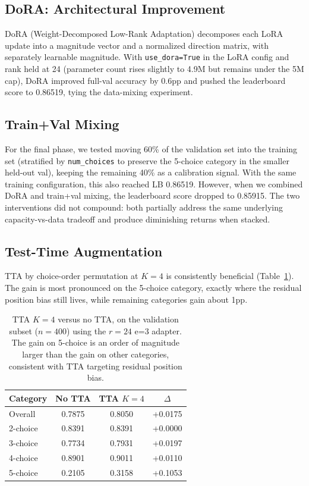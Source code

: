 \documentclass[11pt]{article}
\begin{document}
\subsection{DoRA: Architectural Improvement}

DoRA (Weight-Decomposed Low-Rank Adaptation) decomposes each LoRA update into a magnitude vector and a normalized direction matrix, with separately learnable magnitude. With \texttt{use\_dora=True} in the LoRA config and rank held at 24 (parameter count rises slightly to 4.9M but remains under the 5M cap), DoRA improved full-val accuracy by 0.6pp and pushed the leaderboard score to 0.86519, tying the data-mixing experiment.

\subsection{Train+Val Mixing}

For the final phase, we tested moving 60\% of the validation set into the training set (stratified by \texttt{num\_choices} to preserve the 5-choice category in the smaller held-out val), keeping the remaining 40\% as a calibration signal. With the same training configuration, this also reached LB 0.86519. However, when we combined DoRA and train+val mixing, the leaderboard score dropped to 0.85915. The two interventions did not compound: both partially address the same underlying capacity-vs-data tradeoff and produce diminishing returns when stacked.

\subsection{Test-Time Augmentation}

TTA by choice-order permutation at \(K{=}4\) is consistently beneficial (Table~\ref{tab:tta}). The gain is most pronounced on the 5-choice category, exactly where the residual position bias still lives, while remaining categories gain about 1pp.

\begin{table}[t]
\centering
\small
\begin{tabular}{lccc}
\toprule
\textbf{Category} & \textbf{No TTA} & \textbf{TTA $K{=}4$} & \(\Delta\) \\
\midrule
Overall   & 0.7875 & 0.8050 & +0.0175 \\
2-choice  & 0.8391 & 0.8391 & +0.0000 \\
3-choice  & 0.7734 & 0.7931 & +0.0197 \\
4-choice  & 0.8901 & 0.9011 & +0.0110 \\
5-choice  & 0.2105 & 0.3158 & +0.1053 \\
\bottomrule
\end{tabular}
\caption{TTA $K{=}4$ versus no TTA, on the validation subset ($n{=}400$) using the $r{=}24$ e=3 adapter. The gain on 5-choice is an order of magnitude larger than the gain on other categories, consistent with TTA targeting residual position bias.}
\label{tab:tta}
\end{table}
\end{document}
